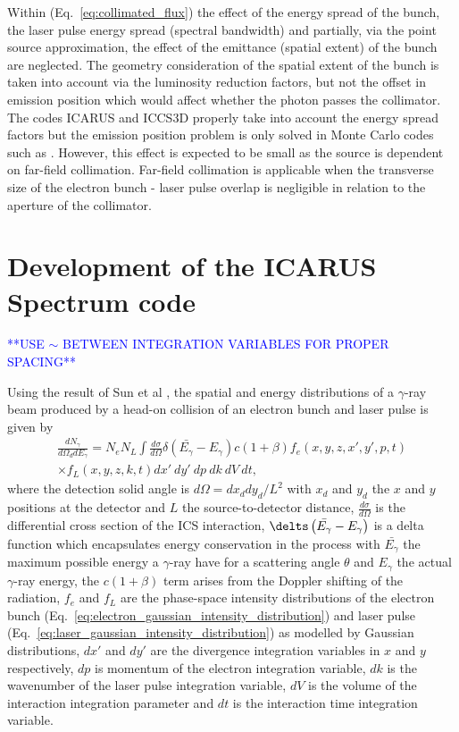 \documentclass[../main.tex]{subfiles}
\begin{document}
Within (Eq.~\ref{eq:collimated_flux}) the effect of the energy spread of the bunch, the laser pulse energy spread (spectral bandwidth) and partially, via the point source approximation, the effect of the emittance (spatial extent) of the bunch are neglected. The geometry consideration of the spatial extent of the bunch is taken into account via the luminosity reduction factors, but not the offset in emission position which would affect whether the photon passes the collimator. The codes \textsc{ICARUS} and \textsc{ICCS3D} \cite{krafft2016laser,ranjan2018simulation} properly take into account the energy spread factors but the emission position problem is only solved in Monte Carlo codes such as  \cite{chen1995cain}. However, this effect is expected to be small as the source is dependent on far-field collimation. Far-field collimation is applicable when the transverse size of the electron bunch - laser pulse overlap is negligible in relation to the aperture of the collimator. 

\section{Development of the ICARUS Spectrum code}
\label{sec:development_of_the_ICARUS_spectrum_code}

\textcolor{blue}{**USE $\sim$ BETWEEN INTEGRATION VARIABLES FOR PROPER SPACING**}

Using the result of Sun et al \cite{sun2009characterizations,sun2011theoretical}, the spatial and energy distributions of a $\gamma$-ray beam produced by a head-on collision of an electron bunch and laser pulse is given by
\begin{multline}
\frac{dN_{\gamma}}{d\Omega_{d} dE_{\gamma}} = N_{e}N_{L}\int \frac{d\sigma}{d\Omega}\delta\left(\bar{E_{\gamma}}-E_{\gamma}\right)c\left(1+\beta\right)f_{e}\left(x,y,z,x',y',p,t\right)\\ \times f_L\left(x,y,z,k,t\right)dx'~dy'~dp~dk~dV~dt,
\label{eq:central_distribution_sun}
\end{multline}
where the detection solid angle is $d\Omega = dx_{d}dy_{d}/L^{2}$ with $x_{d}$ and $y_{d}$ the $x$ and $y$ positions at the detector and $L$ the source-to-detector distance, $\frac{d\sigma}{d\Omega}$ is the differential cross section of the ICS interaction, $\delts\left(\bar{E_{\gamma}}-E_{\gamma}\right)$ is a delta function which encapsulates energy conservation in the process with $\bar{E_{\gamma}}$ the maximum possible energy a $\gamma$-ray have for a scattering angle $\theta$ and $E_{\gamma}$ the actual $\gamma$-ray energy, the $c\left(1+\beta\right)$ term arises from the Doppler shifting of the radiation, $f_{e}$ and $f_{L}$ are the phase-space intensity distributions of the electron bunch (Eq.~\ref{eq:electron_gaussian_intensity_distribution}) and laser pulse (Eq.~\ref{eq:laser_gaussian_intensity_distribution}) as modelled by Gaussian distributions, $dx'$ and $dy'$ are the divergence integration variables in $x$ and $y$ respectively, $dp$ is momentum of the electron integration variable, $dk$ is the wavenumber of the laser pulse integration variable, $dV$ is the volume of the interaction integration parameter and  $dt$ is the interaction time integration variable. 
\end{document}
